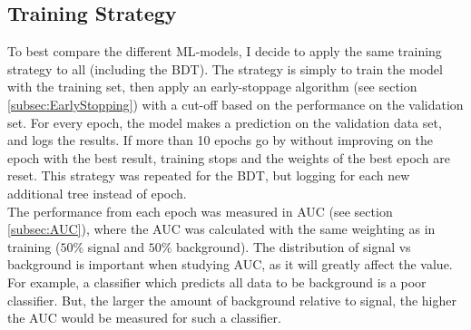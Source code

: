 \subsection{Training Strategy}\label{subsec:TrainingStrategy}
To best compare the different \ac{ML}-models, I decide to apply the same training strategy to all (including the \ac{BDT}). The strategy is simply to train the model 
with the training set, then apply an early-stoppage algorithm (see section \ref{subsec:EarlyStopping}) with a cut-off based on the performance on the validation set. For 
every epoch, the model makes a prediction on the validation data set, and logs the results. If more than 10 epochs go by without improving on the epoch with the best result,
training stops and the weights of the best epoch are reset. This strategy was repeated for the \ac{BDT}, but logging for each new additional tree instead of epoch.
\\
The performance from each epoch was measured in \ac{AUC} (see section \ref{subsec:AUC}), where the \ac{AUC} was calculated with the same weighting as in training ($50\%$ signal
and $50\%$ background). The distribution of signal vs background is important when studying AUC, as it will greatly affect the value. For example, a classifier which predicts all 
data to be background is a poor classifier. But, the larger the amount of background relative to signal, the higher the \ac{AUC} would be measured for such a classifier. 
